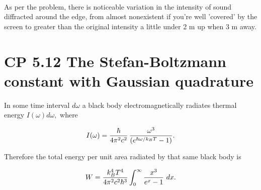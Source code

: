 \documentclass[11pt]{article}
\begin{document}
    \begin{center}
    \end{center}
    { \hspace*{\fill} \\}
    
    As per the problem, there is noticeable variation in the intensity of
sound diffracted around the edge, from almost nonexistent if you're well
'covered' by the screen to greater than the original intensity a little
under 2 m up when 3 m away.

    \section{CP 5.12 The Stefan-Boltzmann constant with Gaussian
quadrature}\label{cp-5.12-the-stefan-boltzmann-constant-with-gaussian-quadrature}

In some time interval \(d\omega\) a black body electromagnetically
radiates thermal energy \(I(\omega) d\omega,\) where

\[I(\omega) = {\hbar\over4\pi^2c^2}\,{\omega^3\over(e^{\hbar\omega/k_BT}-1)}.\]

Therefore the total energy per unit area radiated by that same black
body is

\[W = {k_B^4 T^4\over4\pi^2c^2\hbar^3} \int_0^\infty {x^3\over e^x-1}\ dx.\]
\end{document}
